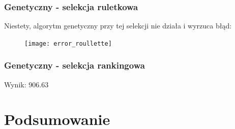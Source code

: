 \documentclass{article}
\begin{document}
\subsubsection{Genetyczny - selekcja ruletkowa}
Niestety, algorytm genetyczny przy tej selekcji nie działa i wyrzuca błąd:

\begin{figure}[H]
	\centering
	\texttt{[image: error\_roullette]}
	\caption{}
	\label{fig:errorroullette}
\end{figure}


\subsubsection{Genetyczny - selekcja rankingowa}
Wynik: 906.63

\section{Podsumowanie}
\end{document}
